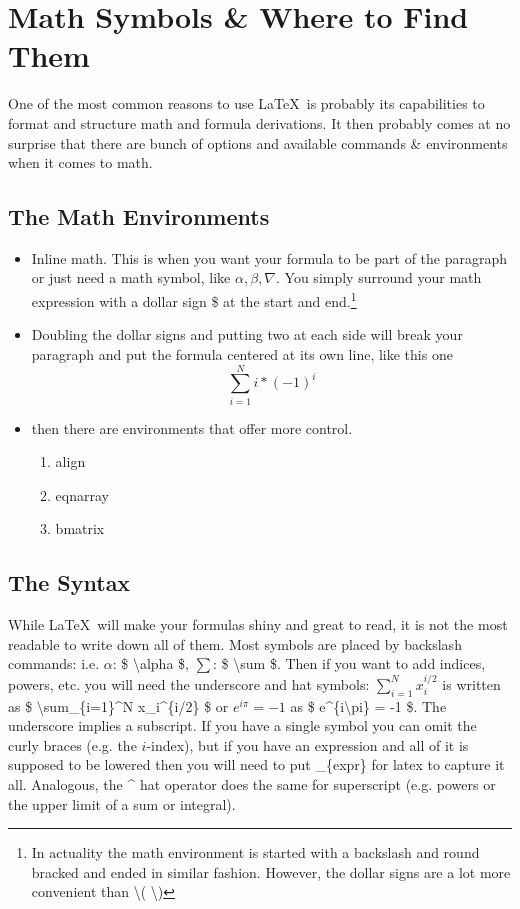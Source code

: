 \section{Math Symbols \& Where to Find Them}
One of the most common reasons to use \LaTeX~is probably its capabilities to format and structure math and formula derivations. It then probably comes at no surprise that there are bunch of options and available commands \& environments when it comes to math.

\subsection{The Math Environments}
\begin{itemize}
    \item Inline math. This is when you want your formula to be part of the paragraph or just need a math symbol, like $\alpha, \beta, \nabla$. You simply surround your math expression with a dollar sign \$ at the start and end.\footnote{In actuality the math environment is started with a backslash and round bracked and ended in similar fashion. However, the dollar signs are a lot more convenient than \textbackslash( \textbackslash)}
    \item Doubling the dollar signs and putting two at each side will break your paragraph and put the formula centered at its own line, like this one $$\sum_{i=1}^N i*(-1)^i$$
    \item then there are environments that offer more control.
        \begin{enumerate}
            \item align
            \item eqnarray
            \item bmatrix
        \end{enumerate}
\end{itemize}

\subsection{The Syntax}
While \LaTeX~will make your formulas shiny and great to read, it is not the most readable to write down all of them. Most symbols are placed by backslash commands:
i.e. $\alpha$: \$ \textbackslash alpha \$, $\sum$: \$ \textbackslash sum \$.
Then if you want to add indices, powers, etc. you will need the underscore and hat symbols: 
$\sum_{i=1}^N x_i^{i/2}$ is written as \$ \textbackslash sum\_\{i=1\}\^{}N x\_i\^{}\{i/2\} \$ or $e^{i\pi}=-1$ as \$ e\^{}\{i\textbackslash pi\} = -1 \$. 
The underscore implies a subscript. If you have a single symbol you can omit the curly braces (e.g. the $i$-index), but if you have an expression and all of it is supposed to be lowered then you will need to put \_\{expr\} for latex to capture it all. Analogous, the \^{} hat operator does the same for superscript (e.g. powers or the upper limit of a sum or integral).


